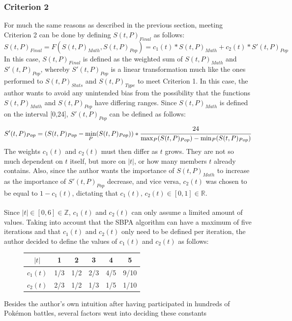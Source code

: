 \documentclass{article}
\begin{document}
\subsubsection{Criterion 2}
For much the same reasons as described in the previous section, meeting Criterion 2 can be done by defining $S(t,P)_{Final}$ as follows:
\begin{equation*}
	S(t,P)_{Final}=F(S(t,P)_{Math},S(t,P)_{Pop})=c_1(t)*S(t,P)_{Math}+c_2(t)*S'(t,P)_{Pop}
\end{equation*}
In this case, $S(t,P)_{Final}$ is defined as the weighted sum of $S(t,P)_{Math}$ and $S'(t,P)_{Pop}$, whereby $S'(t,P)_{Pop}$ is a linear transformation much like the ones performed to $S(t,P)_{Stats}$ and $S(t,P)_{Type}$ to meet Criterion 1. In this case, the author wants to avoid any unintended bias from the possibility that the functions $S(t,P)_{Math}$ and $S(t,P)_{Pop}$ have differing ranges. Since $S(t,P)_{Math}$ is defined on the interval [0,24], $S'(t,P)_{Pop}$ can be defined as follows:
\begin{equation*}
	S'(t,P)_{Pop}=(S(t,P)_{Pop}-\min_P(S(t,P)_{Pop}))*\cfrac{24}{\max_P(S(t,P)_{Pop})-\min_P(S(t,P)_{Pop})}
\end{equation*}
The weights $c_1(t)$ and $c_2(t)$ must then differ as $t$ grows. They are not so much dependent on $t$ itself, but more on $|t|$, or how many members $t$ already contains. Also, since the author wants the importance of $S(t,P)_{Math}$ to increase as the importance of $S'(t,P)_{Pop}$ decrease, and vice versa, $c_2(t)$ was chosen to be equal to $1-c_1(t)$, dictating that $c_1(t)\text{, }c_2(t)\in[0,1]\in\mathbb{R}$.\\\\
Since $|t|\in [0,6]\in\mathbb{Z}$, $c_1(t)$ and $c_2(t)$ can only assume a limited amount of values. Taking into account that the SBPA algorithm can have a maximum of five iterations and that $c_1(t)$ and $c_2(t)$ only need to be defined per iteration, the author decided to define the values of $c_1(t)$ and $c_2(t)$ as follows:
\begin{figure}[H]
	\begin{tabular}{c||c|c|c|c|c}
		$|t|$&1&2&3&4&5\\
		\hline
		$c_1(t)$&1/3&1/2&2/3&4/5&9/10\\
		$c_2(t)$&2/3&1/2&1/3&1/5&1/10
	\end{tabular}
	\centering
\end{figure}
Besides the author's own intuition after having participated in hundreds of Pok\'emon battles, several factors went into deciding these constants
\end{document}
